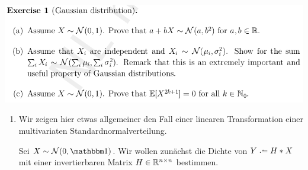 \documentclass[ngerman, a4paper, 11pt]{article}
\newcounter{blattcount}
\theoremstyle{plain}
\theoremstyle{plain}
\theoremstyle{proofstyle}
\begin{document}
\setcounter{blattcount}{6}
\begin{exercisePage}
	
	\begin{center}
		\includegraphics[width=\linewidth]{./exercise1}
	\end{center}
	
	\begin{enumerate}[label=(\alph*), leftmargin=*]
	
	\item
	Wir zeigen hier etwas allgemeiner den Fall einer linearen Transformation einer multivariaten Standardnormalverteilung.
	
	Sei $X \sim \mathcal{N}(0,\one)$. Wir wollen zunächst die Dichte von $Y \defeq H * X$ mit einer invertierbaren Matrix $H \in \mathbb{R}^{n \times n}$ bestimmen. 
	

\end{enumerate}
\end{exercisePage}
\end{document}
